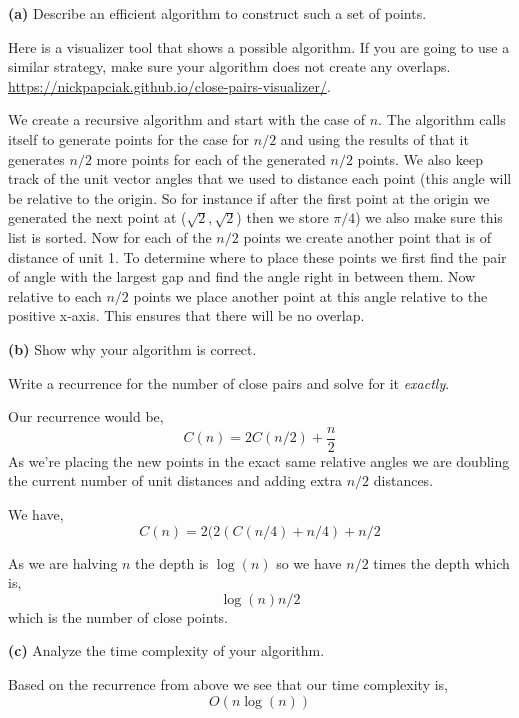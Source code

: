 \documentclass[12pt]{article}
\newcommand{\question}[3][Q]{
\begin{description}
\item \textbf{#1{#2}} #3
\end{description}
}
\newcommand{\hint}[1]{{\footnotesize
    \begin{description}
    [leftmargin=3.3em,style=nextline]
        \item[Hint:] {#1}
    \end{description}}   
}
\begin{document}
\question[]{(a)}{
    Describe an efficient algorithm to construct such a set of points. 

    \hint{Here is a visualizer tool that shows a possible algorithm. If you are going to use a similar strategy, make sure your algorithm does not create any overlaps.
    \url{https://nickpapciak.github.io/close-pairs-visualizer/}.}
}
\begin{answer}
We create a recursive algorithm and start with the case of $n$. The algorithm calls itself to generate points for the case for $n /2$ and using the results of that it generates $n /2$ more points for each of the generated $n /2$ points. We also keep track of the unit vector angles that we used to distance each point (this angle will be relative to the origin. So for instance if after the first point at the origin we generated the next point at ($\sqrt{2},\sqrt{2}$) then we store $\pi /4$) we also make sure this list is sorted. Now for each of the $n /2$ points we create another point that is of distance of unit 1. To determine where to place these points we first find the pair of angle with the largest gap and find the angle right in between them. Now relative to each $n /2$ points we place another point at this angle relative to the positive x-axis. This ensures that there will be no overlap.

\end{answer}

\question[]{(b)}{
    Show why your algorithm is correct.
    \hint{Write a recurrence for the number of close pairs and solve for it \textit{exactly}.}
}
\begin{answer}
    Our recurrence would be, 
    $$ C(n) = 2C(n /2) + \frac{n}{2} $$ 
    As we're placing the new points in the exact same relative angles we are doubling the current number of unit distances and adding extra $n /2$ distances.

    We have,
    $$ C(n) = 2( 2(C(n /4) + n /4) + n /2 $$ 

    As we are halving $n$ the depth is $\log(n)$ so we have $n /2$ times the depth which is, 
    $$\log(n) n /2 $$ 
    which is the number of close points.

\end{answer}

\question[]{(c)}{
    Analyze the time complexity of your algorithm.
}
\begin{answer}
    Based on the recurrence from above we see that our time complexity is, 
    $$ O(n \log(n)) $$ 
\end{answer}
\end{document}
